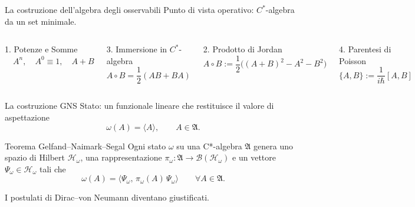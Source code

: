 \documentclass[aspectratio=169,11pt]{beamer}
\begin{document}
	
	\begin{frame}{La costruzione dell'algebra degli osservabili}
		Punto di vista operativo: $C^*$-algebra da un set minimale.
		
		\vspace{0.25cm}
		\begin{columns}[T,onlytextwidth]
			\begin{block}{1. Potenze e Somme}
				\centering\footnotesize
				\vspace{0.15cm}
				$\quad A^n, \quad A^0 \equiv 1, \quad A+B$
				\vspace{0.15cm}
			\end{block}
			\vspace{0.2cm}
			\begin{block}{3. Immersione in $C^*$-algebra}
				\centering\footnotesize
				\vspace{0.1cm}
				$A \circ B = \dfrac12 (AB + BA)$
			\end{block}
			
			\begin{block}{2. Prodotto di Jordan}
				\centering\footnotesize
				\vspace{0.1cm}
				$A \circ B := \dfrac{1}{2}\big((A{+}B)^2 {-} A^2 {-} B^2\big)$
			\end{block}
			\vspace{0.2cm}
			\begin{block}{4. Parentesi di Poisson}
				\centering\footnotesize
				\vspace{0.1cm}
				$\{A,B\} := \dfrac{1}{i\hbar}[A,B]$
			\end{block}
		\end{columns}
		
	\end{frame}
	
	\begin{frame}{La costruzione GNS}
		Stato: un funzionale lineare che restituisce il valore di aspettazione
		$$\omega(A) = \langle A \rangle, \qquad A \in \mathfrak{A}.$$
		\begin{block}{Teorema Gelfand--Naimark--Segal}
			Ogni stato $\omega$ su una C*-algebra $\mathfrak{A}$ genera uno spazio di Hilbert $\mathcal H_\omega$, una rappresentazione $\pi_\omega : \mathfrak{A} \to \mathcal{B}(\mathcal{H}_\omega)$ e un vettore $\Psi_\omega \in \mathcal{H}_\omega$ tali che
			\[
			\omega(A) = \big\langle \Psi_\omega,\, \pi_\omega(A)\,\Psi_\omega \big\rangle \qquad \forall A \in \mathfrak{A}.
			\]
		\end{block}
		I postulati di Dirac--von Neumann diventano giustificati.
	\end{frame}
	
\end{document}
